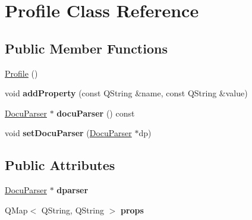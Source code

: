 \hypertarget{classProfile}{
\section{Profile Class Reference}
\label{classProfile}
}
\subsection*{Public Member Functions}
\begin{DoxyCompactItemize}
\item 
\hyperlink{classProfile_a4eea708cdbed0262d9e7ddbe3f1e3f89}{Profile} ()
\item 
\hypertarget{classProfile_a5a24d50193a9ba6df3b1f3027dfe644c}{
void {\bfseries addProperty} (const QString \&name, const QString \&value)}
\label{classProfile_a5a24d50193a9ba6df3b1f3027dfe644c}

\item 
\hypertarget{classProfile_a6f26f2521e5828b19274c0294213ef40}{
\hyperlink{classDocuParser}{DocuParser} $\ast$ {\bfseries docuParser} () const }
\label{classProfile_a6f26f2521e5828b19274c0294213ef40}

\item 
\hypertarget{classProfile_a4c30c38dc0f17a7d0cfac9740c56f69b}{
void {\bfseries setDocuParser} (\hyperlink{classDocuParser}{DocuParser} $\ast$dp)}
\label{classProfile_a4c30c38dc0f17a7d0cfac9740c56f69b}

\end{DoxyCompactItemize}
\subsection*{Public Attributes}
\begin{DoxyCompactItemize}
\item 
\hypertarget{classProfile_ac376fcccf378d107a4871b91642fe6fc}{
\hyperlink{classDocuParser}{DocuParser} $\ast$ {\bfseries dparser}}
\label{classProfile_ac376fcccf378d107a4871b91642fe6fc}

\item 
\hypertarget{classProfile_ae003f81d6af3691a4f975fcdfea3f318}{
QMap$<$ QString, QString $>$ {\bfseries props}}
\label{classProfile_ae003f81d6af3691a4f975fcdfea3f318}

\end{DoxyCompactItemize}


